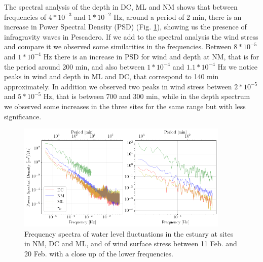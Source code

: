 \documentclass[tesis.tex]{subfiles}
\begin{document}
    The spectral analysis of the depth in DC, ML and NM shows that between frequencies of $4*10^{-3}$ and $1*10^{-2}$ Hz, around a period of 2 min, there is an increase in Power Spectral Density (PSD) (Fig. \ref{fig:freq}), showing us the presence of infragravity waves in Pescadero. If we add to the spectral analysis the wind stress and compare it we observed some similarities in the frequencies. Between $8*10^{-5}$ and $1*10^{-4}$ Hz there is an increase in PSD for wind and depth at NM, that is for the period around 200 min, and also between $1*10^{-4}$ and $1.1*10^{-4}$ Hz we notice peaks in wind and depth in ML and DC, that correspond to 140 min approximately. In addition we observed two peaks in wind stress between $2*10^{-5}$ and $5*10^{-5}$ Hz, that is between 700 and 300 min, while in the depth spectrum we observed some increases in the three sites for the same range but with less significance.
    
    \begin{figure}[h!]
      \centering
      \includegraphics[width=0.9\textwidth]{Imagenes/freqs.png}
      \caption{Frequency spectra of water level fluctuations in the estuary at sites in NM, DC and ML, and of wind surface stress between 11 Feb. and 20 Feb. with a close up of the lower frequencies.}
      \label{fig:freq}
    \end{figure}
\end{document}

